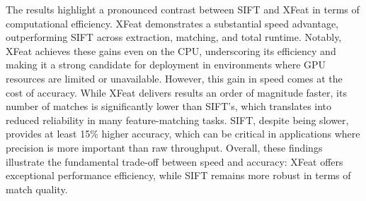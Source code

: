 The results highlight a pronounced contrast between SIFT and XFeat in terms of
computational efficiency. XFeat demonstrates a substantial speed advantage,
outperforming SIFT across extraction, matching, and total runtime. Notably,
XFeat achieves these gains even on the CPU, underscoring its efficiency and
making it a strong candidate for deployment in environments where GPU resources
are limited or unavailable. However, this gain in speed comes at the cost of
accuracy. While XFeat delivers results an order of magnitude faster, its number
of matches is significantly lower than SIFT's, which translates into reduced
reliability in many feature-matching tasks. SIFT, despite being slower,
provides at least 15\% higher accuracy, which can be critical in applications
where precision is more important than raw throughput. Overall, these findings
illustrate the fundamental trade-off between speed and accuracy: XFeat offers
exceptional performance efficiency, while SIFT remains more robust in terms of
match quality.
